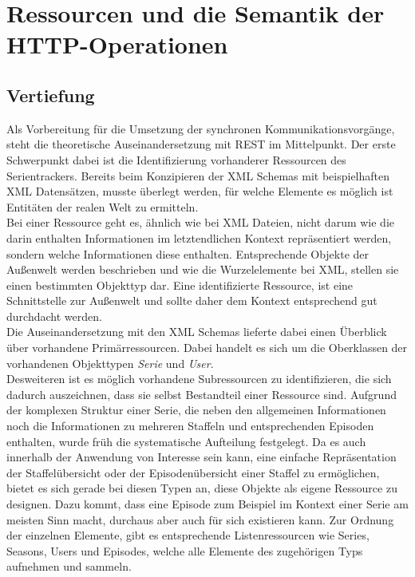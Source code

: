 
\section{Ressourcen und die Semantik der HTTP-Operationen}
\subsection{Vertiefung}

Als Vorbereitung für die Umsetzung der synchronen Kommunikationsvorgänge, steht die theoretische Auseinandersetzung mit REST im Mittelpunkt.
Der erste Schwerpunkt dabei ist die Identifizierung vorhanderer Ressourcen des Serientrackers. Bereits beim Konzipieren der XML Schemas mit beispielhaften XML Datensätzen, musste überlegt werden, für welche Elemente es möglich ist Entitäten der realen Welt zu ermitteln.\\

Bei einer Ressource geht es, ähnlich wie bei XML Dateien, nicht darum wie die darin enthalten Informationen im letztendlichen Kontext repräsentiert werden, sondern welche Informationen diese enthalten. Entsprechende Objekte der Außenwelt werden beschrieben und wie die Wurzelelemente bei XML, stellen sie einen bestimmten Objekttyp dar. Eine identifizierte Ressource, ist eine Schnittstelle zur Außenwelt und sollte daher dem Kontext entsprechend gut durchdacht werden.\\
Die Auseinandersetzung mit den XML Schemas lieferte dabei einen Überblick über vorhandene Primärressourcen. Dabei handelt es sich um die Oberklassen der vorhandenen Objekttypen \textit{Serie} und \textit{User}.\\

Desweiteren ist es möglich vorhandene Subressourcen zu identifizieren, die sich dadurch auszeichnen, dass sie selbst Bestandteil einer Ressource sind.
Aufgrund der komplexen Struktur einer Serie, die neben den allgemeinen Informationen noch die Informationen zu mehreren Staffeln und entsprechenden Episoden enthalten, wurde früh die systematische Aufteilung festgelegt.
Da es auch innerhalb der Anwendung von Interesse sein kann, eine einfache Repräsentation der Staffelübersicht oder der Episodenübersicht einer Staffel zu ermöglichen, bietet es sich gerade bei diesen Typen an, diese Objekte als eigene Ressource zu designen. Dazu kommt, dass eine Episode zum Beispiel im Kontext einer Serie am meisten Sinn macht, durchaus aber auch für sich existieren kann. Zur Ordnung der einzelnen Elemente, gibt es entsprechende Listenressourcen wie Series, Seasons, Users und Episodes, welche alle Elemente des zugehörigen Typs aufnehmen und sammeln.\\

